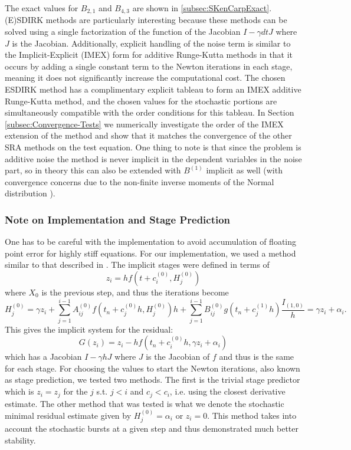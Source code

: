 \documentclass{article}
\begin{document}
The exact values for $B_{2,1}$ and $B_{4,3}$ are shown in \ref*{subsec:SKenCarpExact}.
(E)SDIRK methods are particularly interesting because these methods
can be solved using a single factorization of the function of the
Jacobian $I-\gamma dtJ$ where $J$ is the Jacobian. Additionally,
explicit handling of the noise term is similar to the Implicit-Explicit
(IMEX) form for additive Runge-Kutta methods in that it occurs by
adding a single constant term to the Newton iterations in each stage,
meaning it does not significantly increase the computational cost.
The chosen ESDIRK method has a complimentary explicit tableau to form
an IMEX additive Runge-Kutta method, and the chosen values for the
stochastic portions are simultaneously compatible with the order conditions
for this tableau. In Section \ref{subsec:Convergence-Tests} we numerically
investigate the order of the IMEX extension of the method and show
that it matches the convergence of the other SRA methods on the test
equation. One thing to note is that since the problem is additive
noise the method is never implicit in the dependent variables in the
noise part, so in theory this can also be extended with $B^{(1)}$
implicit as well (with convergence concerns due to the non-finite
inverse moments of the Normal distribution \cite{RN3169}).

\subsubsection{Note on Implementation and Stage Prediction}

One has to be careful with the implementation to avoid accumulation
of floating point error for highly stiff equations. For our implementation,
we used a method similar to that described in \cite{RN3793}. The
implicit stages were defined in terms of
\begin{equation}
z_{i}=hf\left(t+c_{i}^{(0)},H_{j}^{(0)}\right)\label{eq:zi}
\end{equation}
where $X_{0}$ is the previous step, and thus the iterations become
\begin{equation}
H_{j}^{(0)}=\gamma z_{i}+\sum_{j=1}^{i-1}A_{ij}^{(0)}f\left(t_{n}+c_{j}^{(0)}h,H_{j}^{(0)}\right)h+\sum_{j=1}^{i-1}B_{ij}^{(0)}g\left(t_{n}+c_{j}^{(1)}h\right)\frac{I_{(1,0)}}{h}=\gamma z_{i}+\alpha_{i}.\label{eq:z}
\end{equation}
This gives the implicit system for the residual:
\[
G(z_{i})=z_{i}-hf\left(t_{n}+c_{i}^{(0)}h,\gamma z_{i}+\alpha_{i}\right)
\]
which has a Jacobian $I-\gamma hJ$ where $J$ is the Jacobian of
$f$ and thus is the same for each stage. For choosing the values
to start the Newton iterations, also known as stage prediction, we
tested two methods. The first is the trivial stage predictor which
is $z_{i}=z_{j}$ for the $j$ s.t. $j<i$ and $c_{j}<c_{i}$, i.e.
using the closest derivative estimate. The other method that was tested
is what we denote the stochastic minimal residual estimate given by
$H_{j}^{(0)}=\alpha_{i}$ or $z_{i}=0$. This method takes into account
the stochastic bursts at a given step and thus demonstrated much better
stability.
\end{document}
